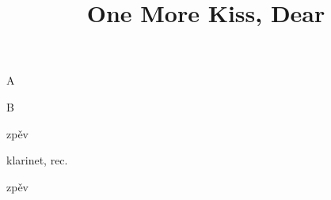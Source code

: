 \documentclass[timestamp]{jazzgrid}
\title{One More Kiss, Dear}
\begin{document}
\maketitle
\begin{musicsection}{A}
\barline
	{}
	{\barfour{}{}{}{}{}}
	{}
	{\barfour{}{}{}{}{}}
\barline
	{}
	{\barfour{}{}{}{}{}}
	{}
	{\barfour{}{}{}{}{}}
\barline
	{}
	{}
	{}
	{}
\barline
	{}
	{\barfour{}{}{}{}{}}
	{}
	{\barfour{}{}{}{}{}}
\barline
	{}
	{}
	{}
	{}
\end{musicsection}

\begin{musicsection}{B}
\barline
	{}
	{}
	{}
	{}
\barline
	{}
	{}
	{}
	{}
\end{musicsection}

\begin{multicols*}{2}
\begin{description}[noitemsep,align=right,labelwidth=\widthof{\bfseries{\scriptsize AABA}}]
	\scriptsize
	\item [AABA] zpěv
	\item [A] klarinet, rec.
	\item [A] zpěv
\end{description}

\end{multicols*}
\end{document}
